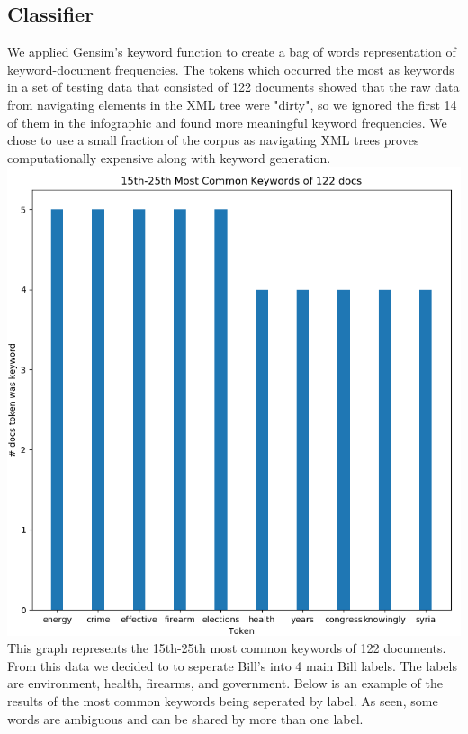\documentclass[11pt,a4paper]{article}
\begin{document}
\subsection{Classifier}
 We applied Gensim's keyword function to create a bag of words representation of keyword-document frequencies. The tokens which occurred the most as keywords in a set of testing data that consisted of 122 documents showed that the raw data from navigating elements in the XML tree were "dirty", so we ignored the first 14 of them in the infographic and found more meaningful keyword frequencies. We chose to use a small fraction of the corpus as navigating XML trees proves computationally expensive along with keyword generation.
  \includegraphics[scale=0.43]{test_kw-mostcommon_15-25}
 This graph represents the 15th-25th most common keywords of 122 documents. From this data we decided to to seperate Bill's into 4 main Bill labels. The labels are environment, health, firearms, and government. Below is an example of the results of the most common keywords being seperated by label. As seen, some words are ambiguous and can be shared by more than one label.
 \newline
\end{document}
